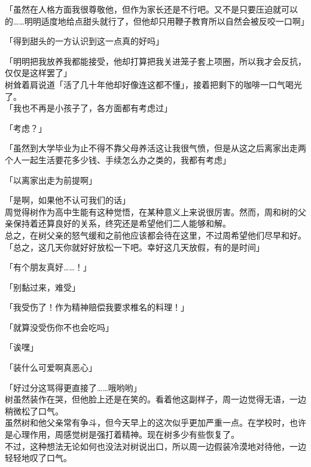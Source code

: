 「虽然在人格方面我很尊敬他，但作为家长还是不行吧。又不是只要压迫就可以的……明明适度地给点甜头就行了，但他却只用鞭子教育所以自然会被反咬一口啊」

「得到甜头的一方认识到这一点真的好吗」

「明明把我放养我都能接受，他却打算把我关进笼子套上项圈，所以我才会反抗，仅仅是这样罢了」\\

树耸着肩说道「活了几十年他却好像连这都不懂」，接着把剩下的咖啡一口气喝光了。\\

「我也不再是小孩子了，各方面都有考虑过」

「考虑？」

「虽然到大学毕业为止不得不靠父母养活这让我很气愤，但是从这之后离家出走两个人一起生活要花多少钱、手续怎么办之类的，我都有考虑」

「以离家出走为前提啊」

「是啊，如果他不认可我们的话」\\

周觉得树作为高中生能有这种觉悟，在某种意义上来说很厉害。然而，周和树的父亲保持着还算良好的关系，终究还是希望他们二人能够和解。\\

总之，在树父亲的怒气缓和之前他应该都会待在这里，不过周希望他们尽早和好。\\

「总之，这几天你就好好放松一下吧。幸好这几天放假，有的是时间」

「有个朋友真好……！」

「别黏过来，难受」

「我受伤了！作为精神赔偿我要求椎名的料理！」

「就算没受伤你不也会吃吗」

「诶嘿」

「装什么可爱啊真恶心」

「好过分这骂得更直接了……哦哟哟」\\

树虽然装作在哭，但他脸上还是在笑的。看着他这副样子，周一边觉得无语，一边稍微松了口气。\\

虽然树和他父亲常有争斗，但今天早上的这次似乎更加严重一点。在学校时，也许是心理作用，周感觉树是强打着精神。现在树多少有些恢复了。\\

不过，这种想法无论如何也没法对树说出口，所以周一边假装冷漠地对待他，一边轻轻地叹了口气。\\


